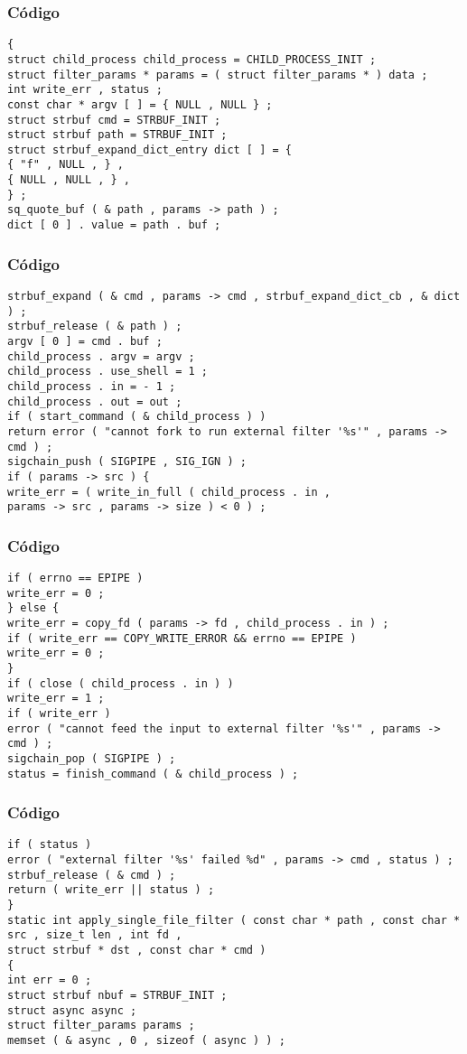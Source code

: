 \documentclass{beamer}
\begin{document}
\begin{frame}[fragile]
\frametitle{C\'odigo}
\begin{verbatim}
{ 
struct child_process child_process = CHILD_PROCESS_INIT ; 
struct filter_params * params = ( struct filter_params * ) data ; 
int write_err , status ; 
const char * argv [ ] = { NULL , NULL } ; 
struct strbuf cmd = STRBUF_INIT ; 
struct strbuf path = STRBUF_INIT ; 
struct strbuf_expand_dict_entry dict [ ] = { 
{ "f" , NULL , } , 
{ NULL , NULL , } , 
} ; 
sq_quote_buf ( & path , params -> path ) ; 
dict [ 0 ] . value = path . buf ; 
\end{verbatim}
\end{frame}
\begin{frame}[fragile]
\frametitle{C\'odigo}
\begin{verbatim}
strbuf_expand ( & cmd , params -> cmd , strbuf_expand_dict_cb , & dict ) ; 
strbuf_release ( & path ) ; 
argv [ 0 ] = cmd . buf ; 
child_process . argv = argv ; 
child_process . use_shell = 1 ; 
child_process . in = - 1 ; 
child_process . out = out ; 
if ( start_command ( & child_process ) ) 
return error ( "cannot fork to run external filter '%s'" , params -> cmd ) ; 
sigchain_push ( SIGPIPE , SIG_IGN ) ; 
if ( params -> src ) { 
write_err = ( write_in_full ( child_process . in , 
params -> src , params -> size ) < 0 ) ; 
\end{verbatim}
\end{frame}
\begin{frame}[fragile]
\frametitle{C\'odigo}
\begin{verbatim}
if ( errno == EPIPE ) 
write_err = 0 ; 
} else { 
write_err = copy_fd ( params -> fd , child_process . in ) ; 
if ( write_err == COPY_WRITE_ERROR && errno == EPIPE ) 
write_err = 0 ; 
} 
if ( close ( child_process . in ) ) 
write_err = 1 ; 
if ( write_err ) 
error ( "cannot feed the input to external filter '%s'" , params -> cmd ) ; 
sigchain_pop ( SIGPIPE ) ; 
status = finish_command ( & child_process ) ; 
\end{verbatim}
\end{frame}
\begin{frame}[fragile]
\frametitle{C\'odigo}
\begin{verbatim}
if ( status ) 
error ( "external filter '%s' failed %d" , params -> cmd , status ) ; 
strbuf_release ( & cmd ) ; 
return ( write_err || status ) ; 
} 
static int apply_single_file_filter ( const char * path , const char * src , size_t len , int fd , 
struct strbuf * dst , const char * cmd ) 
{ 
int err = 0 ; 
struct strbuf nbuf = STRBUF_INIT ; 
struct async async ; 
struct filter_params params ; 
memset ( & async , 0 , sizeof ( async ) ) ; 
\end{verbatim}
\end{frame}
\end{document}
